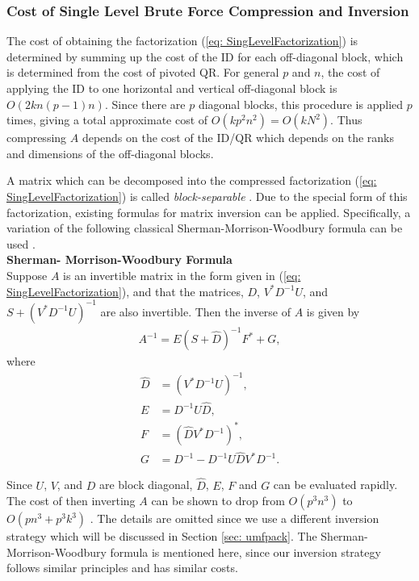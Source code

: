 \documentclass{sfuthesis}
\begin{document}
\subsubsection{Cost of Single Level Brute Force Compression and Inversion}
The cost of obtaining the factorization (\ref{eq: SingLevelFactorization}) is determined by summing up the cost of the ID for each off-diagonal block, which is determined from the cost of pivoted QR. For general $p$ and $n$, the cost of applying the ID to one horizontal and vertical off-diagonal block is $O(2kn(p-1)n)$. Since there are $p$ diagonal blocks, this procedure is applied $p$ times, giving a total approximate cost of $O(kp^2n^2) = O(kN^2)$. Thus compressing $A$ depends on the cost of the ID/QR which depends on the ranks and dimensions of the off-diagonal blocks. 

A matrix which can be decomposed into the compressed factorization (\ref{eq: SingLevelFactorization}) is called \textit{block-separable} \cite{GillYoungMart2012, HoGreen2012}. Due to the special form of this factorization, existing formulas for matrix inversion can be applied. Specifically, a variation of the following classical Sherman-Morrison-Woodbury formula can be used \cite{GillYoungMart2012}. \\

\noindent \textbf{Sherman- Morrison-Woodbury Formula}\\
Suppose $A$ is an invertible matrix in the form given in (\ref{eq: SingLevelFactorization}), and that the matrices, $D$, $V^*D^{-1}U$, and $S + {(V^*D^{-1}U)}^{-1}$ are also invertible. 
Then the inverse of $A$ is given by 
\begin{align*}
	A^{-1}=E{(S+\hat{D})}^{-1}F^* + G, 
\end{align*}
where 
\begin{align*}
	\hat{D} &= {(V^*D^{-1}U)}^{-1},\\
	E &= D^{-1}U\hat{D}, \\
	F &=  {(\hat{D}V^*D^{-1})}^*, \\
	G &= {D}^{-1} - D^{-1}U\hat{D}V^*D^{-1}. 
\end{align*}

Since $U$, $V$, and $D$ are block diagonal, $\hat{D}$, $E$, $F$ and $G$ can be evaluated rapidly. The cost of then inverting $A$ can be shown to drop from $O(p^3n^3)$ to $O(pn^3+p^3k^3)$ \cite{GillYoungMart2012}. The details are omitted since we use a different inversion strategy which will be discussed in Section \ref{sec: umfpack}. The Sherman-Morrison-Woodbury formula is mentioned here, since our inversion strategy follows similar principles and has similar costs. 
\end{document}
